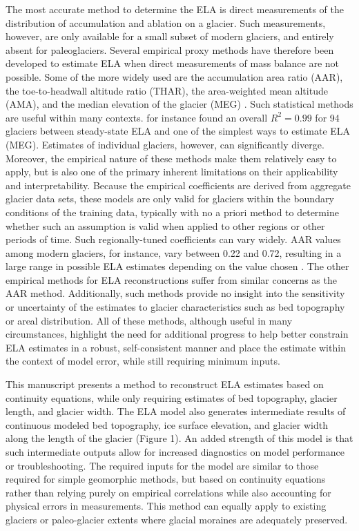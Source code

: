 \documentclass[review]{elsarticle}
\begin{document}
The most accurate method to determine the ELA is direct measurements of the distribution of accumulation and ablation on a glacier.
Such measurements, however, are only available for a small subset of modern glaciers, and entirely absent for paleoglaciers.
Several empirical proxy methods have therefore been developed to estimate ELA when direct measurements of mass balance are not possible.
Some of the more widely used are the accumulation area ratio (AAR), the toe-to-headwall altitude ratio (THAR), the area-weighted mean altitude (AMA), and the median elevation of the glacier (MEG) \cite{benn_mass_2000, braithwaite_estimating_2009}.
Such statistical methods are useful within many contexts.
\cite{braithwaite_estimating_2009} for instance found an overall $R^2 = 0.99$ for 94 glaciers between steady-state ELA and one of the simplest ways to estimate ELA (MEG).
Estimates of individual glaciers, however, can significantly diverge.
Moreover, the empirical nature of these methods make them relatively easy to apply, but is also one of the primary inherent limitations on their applicability and interpretability.
Because the empirical coefficients are derived from aggregate glacier data sets, these models are only valid for glaciers within the boundary conditions of the training data, typically with no a priori method to determine whether such an assumption is valid when applied to other regions or other periods of time.
Such regionally-tuned coefficients can vary widely.
AAR values among modern glaciers, for instance, vary between 0.22 and 0.72, resulting in a large range in possible ELA estimates depending on the value chosen \cite{zemp_distributed_2007}.
The other empirical methods for ELA reconstructions suffer from similar concerns as the AAR method.
Additionally, such methods provide no insight into the sensitivity or uncertainty of the estimates to glacier characteristics such as bed topography or areal distribution.
All of these methods, although useful in many circumstances, highlight the need for additional progress to help better constrain ELA estimates in a robust, self-consistent manner and place the estimate within the context of model error, while still requiring minimum inputs.

This manuscript presents a method to reconstruct ELA estimates based on continuity equations, while only requiring estimates of bed topography, glacier length, and glacier width.
The ELA model also generates intermediate results of continuous modeled bed topography, ice surface elevation, and glacier width along the length of the glacier (Figure 1).
An added strength of this model is that such intermediate outputs allow for increased diagnostics on model performance or troubleshooting.
The required inputs for the model are similar to those required for simple geomorphic methods, but based on continuity equations rather than relying purely on empirical correlations while also accounting for physical errors in measurements.
This method can equally apply to existing glaciers or paleo-glacier extents where glacial moraines are adequately preserved.
\end{document}
